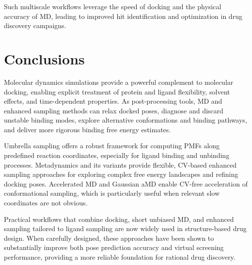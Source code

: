 \documentclass[12pt,a4paper]{article}
\begin{document}
Such multiscale workflows leverage the speed of docking and the physical accuracy of MD, leading to improved hit identification and optimization in drug discovery campaigns.

\section{Conclusions}

Molecular dynamics simulations provide a powerful complement to molecular docking, enabling explicit treatment of protein and ligand flexibility, solvent effects, and time-dependent properties. As post-processing tools, MD and enhanced sampling methods can relax docked poses, diagnose and discard unstable binding modes, explore alternative conformations and binding pathways, and deliver more rigorous binding free energy estimates.

Umbrella sampling offers a robust framework for computing PMFs along predefined reaction coordinates, especially for ligand binding and unbinding processes. Metadynamics and its variants provide flexible, CV-based enhanced sampling approaches for exploring complex free energy landscapes and refining docking poses. Accelerated MD and Gaussian aMD enable CV-free acceleration of conformational sampling, which is particularly useful when relevant slow coordinates are not obvious.

Practical workflows that combine docking, short unbiased MD, and enhanced sampling tailored to ligand sampling are now widely used in structure-based drug design. When carefully designed, these approaches have been shown to substantially improve both pose prediction accuracy and virtual screening performance, providing a more reliable foundation for rational drug discovery.

\end{document}
